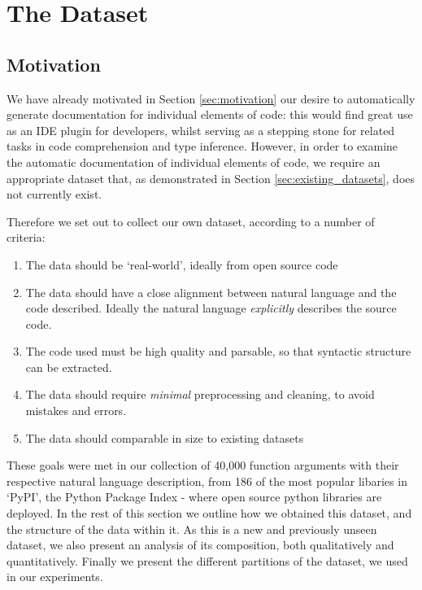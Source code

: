 \chapter{The Dataset}
\label{the_dataset}

\section{Motivation}

We have already motivated in Section \ref{sec:motivation} our desire to automatically generate documentation for individual elements of code: this would find great use as an IDE plugin for developers, whilst serving as a stepping stone for related tasks in code comprehension and type inference.
However, in order to examine the automatic documentation of individual elements of code, we require an appropriate dataset that, as demonstrated in Section \ref{sec:existing_datasets}, does not currently exist.

Therefore we set out to collect our own dataset, according to a number of criteria:

\begin{enumerate}
    \item The data should be `real-world', ideally from open source code
    \item The data should have a close alignment between natural language and the code described. Ideally the natural language \textit{explicitly} describes the source code.
    \item The code used must be high quality and parsable, so that syntactic structure can be extracted.
    \item The data should require \textit{minimal} preprocessing and cleaning, to avoid mistakes and errors.
    \item The data should comparable in size to existing datasets
\end{enumerate}

These goals were met in our collection of 40,000 function arguments with their respective natural language description, from 186 of the most popular libaries in `PyPI', the Python Package Index - where open source python libraries are deployed. In the rest of this section we outline how we obtained this dataset, and the structure of the data within it. As this is a new and previously unseen dataset, we also present an analysis of its composition, both qualitatively and quantitatively.
Finally we present the different partitions of the dataset, we used in our experiments.


